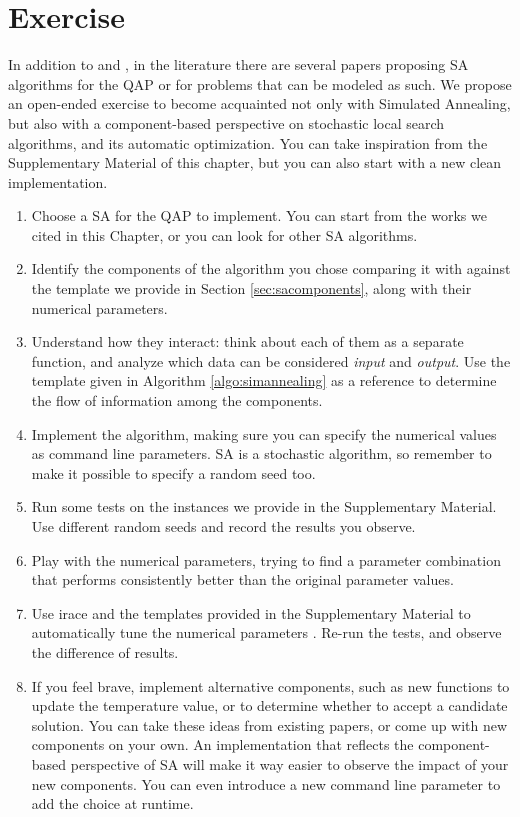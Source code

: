 \section{Exercise}\label{sec:exercise}
In addition to \brsa and \qsa, in the literature there are several papers
proposing SA algorithms for the QAP or for problems that can be modeled
as such. 
We propose an open-ended exercise to become acquainted not only with 
Simulated Annealing, but also with a component-based perspective
on stochastic local search algorithms, and its automatic optimization.
You can take inspiration from the Supplementary Material of this chapter, but you can also start with a new clean implementation.

\begin{enumerate}
    \item Choose a SA for the QAP to implement. You can start from the works we
    cited in this Chapter, or you can look for other SA algorithms.
    \item Identify the components of the algorithm you chose
    comparing it with against the template we provide in Section
    \ref{sec:sacomponents}, along with their numerical parameters.
    \item Understand how they interact: think about each of them as a separate
    function, and analyze which data can be considered \textit{input}
    and \textit{output}.
    Use the template given in Algorithm \ref{algo:simannealing} as a  
    reference to determine the flow of information among the components.
    \item Implement the algorithm, making sure you can specify the 
    numerical values as command line parameters. SA is
    a stochastic algorithm, so remember to
    make it possible to specify a random seed too.
    \item Run some tests on the instances we provide in the Supplementary
    Material. Use different random seeds and record the results
    you observe.
    \item Play with the numerical parameters, trying to find
    a parameter combination that performs consistently better than
    the original parameter values.
    \item Use irace and the templates
    provided in the Supplementary Material to automatically tune
    the numerical parameters \cite{LopDubPerStuBir2016irace}. 
    Re-run the tests, and observe the difference of results.
    \item If you feel brave, implement alternative components, such as
    new functions to update the temperature value, or to determine 
    whether to accept a candidate solution. You can take these ideas
    from existing papers, or come up with new components on your own.
    An implementation that reflects the component-based perspective
    of SA will make it way easier to observe the impact of your new
    components. You can even introduce a new command line parameter
    to add the choice at runtime.
\end{enumerate}

